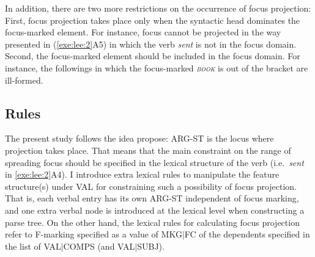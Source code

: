 
\noindent In addition, there are two more restrictions on the
occurrence of focus projection: First, focus projection takes place
only when the syntactic head dominates the focus-marked element.  For
instance, focus cannot be projected in the way presented in
(\ref{exe:lee:2}A5) in which the verb \textit{sent} is not in the
focus domain.  Second, the focus-marked element should be included in
the focus domain. For instance, the followings in which the
focus-marked \textit{\textsc{book}} is out of the bracket are
ill-formed.



\subsection{Rules}
\label{10-4:ssec:Rules}


The present study follows the idea \citet{chung:etal:03} propose:
ARG-ST is the locus where  projection takes place. That means that the main constraint on the range of
spreading focus should be specified in the lexical structure of the
verb (i.e.\ \textit{sent} in \ref{exe:lee:2}A4). I introduce extra
lexical rules to manipulate the feature structure(s) under VAL for
constraining such a possibility of focus projection. That is, each
verbal entry has its own ARG-ST independent of focus marking, and one
extra verbal node is introduced at the lexical level when constructing
a parse tree. On the other hand, the lexical rules for calculating
focus projection refer to F-marking specified as a value of
MKG{$\mid$}FC of the dependents specified in the list of
VAL{$\mid$}COMPS (and VAL{$\mid$}SUBJ).




